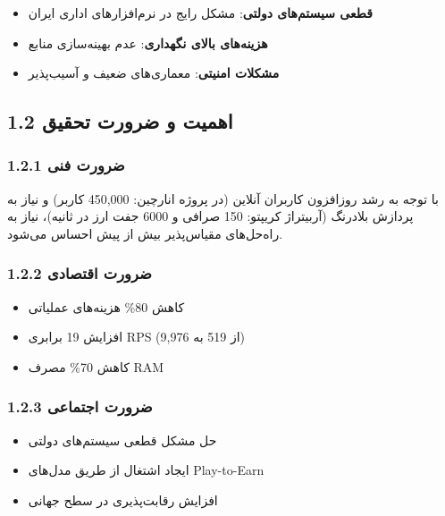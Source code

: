 \documentclass[
]{article}
\providecommand{\tightlist}{%
  \setlength{\itemsep}{0pt}\setlength{\parskip}{0pt}}
\begin{document}
\begin{itemize}
\tightlist
\item
  \textbf{قطعی سیستم‌های دولتی}: مشکل رایج در نرم‌افزارهای اداری ایران
\item
  \textbf{هزینه‌های بالای نگهداری}: عدم بهینه‌سازی منابع
\item
  \textbf{مشکلات امنیتی}: معماری‌های ضعیف و آسیب‌پذیر
\end{itemize}

\subsection{1.2 اهمیت و ضرورت
تحقیق}\label{ux627ux647ux645ux6ccux62a-ux648-ux636ux631ux648ux631ux62a-ux62aux62dux642ux6ccux642}

\subsubsection{1.2.1 ضرورت
فنی}\label{ux636ux631ux648ux631ux62a-ux641ux646ux6cc}

با توجه به رشد روزافزون کاربران آنلاین (در پروژه انارچین: 450,000 کاربر)
و نیاز به پردازش بلادرنگ (آربیتراژ کریپتو: 150 صرافی و 6000 جفت ارز در
ثانیه)، نیاز به راه‌حل‌های مقیاس‌پذیر بیش از پیش احساس می‌شود.

\subsubsection{1.2.2 ضرورت
اقتصادی}\label{ux636ux631ux648ux631ux62a-ux627ux642ux62aux635ux627ux62fux6cc}

\begin{itemize}
\tightlist
\item
  کاهش 80\% هزینه‌های عملیاتی
\item
  افزایش 19 برابری RPS (از 519 به 9,976)
\item
  کاهش 70\% مصرف RAM
\end{itemize}

\subsubsection{1.2.3 ضرورت
اجتماعی}\label{ux636ux631ux648ux631ux62a-ux627ux62cux62aux645ux627ux639ux6cc}

\begin{itemize}
\tightlist
\item
  حل مشکل قطعی سیستم‌های دولتی
\item
  ایجاد اشتغال از طریق مدل‌های Play-to-Earn
\item
  افزایش رقابت‌پذیری در سطح جهانی
\end{itemize}
\end{document}
